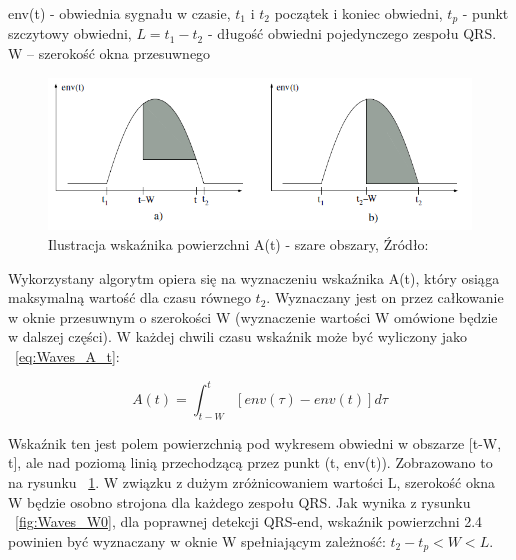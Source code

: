 \begin{description}
env(t) - obwiednia sygnału w czasie, \newline
$t_1 $ i $t_2$  początek i koniec obwiedni, \newline
$t_p$ - punkt szczytowy obwiedni, \newline
$L = t_{1}-t_{2}$ - długość obwiedni pojedynczego zespołu QRS. \newline
W – szerokość okna przesuwnego

\begin{figure}[h]
\centering
\includegraphics[width=\textwidth,keepaspectratio] {Waves/img/A_t.png}
\caption{Ilustracja wskaźnika powierzchni A(t) - szare obszary, Źródło: \cite{Waves_QRSAlg}}
\label{fig:Waves_A_t}
\end{figure}

Wykorzystany algorytm opiera się na wyznaczeniu wskaźnika A(t), który osiąga maksymalną wartość dla czasu równego $t_2$. Wyznaczany jest on przez całkowanie w oknie przesuwnym o szerokości W (wyznaczenie wartości W omówione będzie w dalszej części). W każdej chwili czasu wskaźnik może być wyliczony jako ~\ref{eq:Waves_A_t}:

\begin{equation} \label{eq:Waves_A_t}
A(t)=\int_{t-W}^t [env(\tau)-env(t)]d\tau
\end{equation}

Wskaźnik ten jest polem powierzchnią pod wykresem obwiedni w obszarze [t-W, t], ale nad poziomą linią przechodzącą przez punkt (t, env(t)). Zobrazowano to na rysunku ~\ref{fig:Waves_A_t}.
W związku z dużym zróżnicowaniem wartości L, szerokość okna W będzie osobno strojona dla każdego zespołu QRS. Jak wynika z rysunku ~\ref{fig:Waves_W0}, dla poprawnej detekcji QRS-end, wskaźnik powierzchni 2.4 powinien być wyznaczany w oknie W spełniającym zależność: $t_2 - t_p < W < L$.


\end{description}
